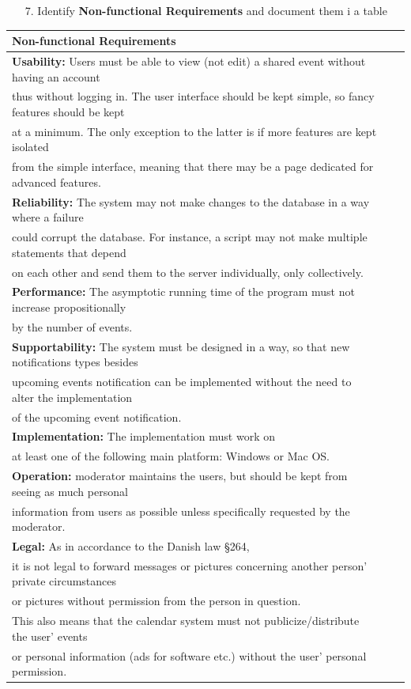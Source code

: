 \documentclass{article}
\begin{document}
\begin{enumerate}
		\item[7.] Identify \textbf{Non-functional Requirements} and document them i a table\\
\end{enumerate}

\begin{tabular}{l r @{} l}
	\textbf{Non-functional Requirements}\\
	\hline
	\textbf{Usability:} Users must be able to view (not edit) a shared event without having an account\\
	 thus without logging in. The user interface should be kept simple, so fancy features should be kept\\
	 at a minimum. The only exception to the latter is if more features are kept isolated\\ 
	 from the simple interface, meaning that there may be a page dedicated for advanced features.\\
	\hline
	\textbf{Reliability:} The system may not make changes to the database in a way where a failure\\
	 could corrupt the database. For instance, a script may not make multiple statements that depend\\
	 on each other and send them to the server individually, only collectively.\\
	\hline
	\textbf{Performance:} The asymptotic running time of the program must not increase propositionally\\
	by the number of events.\\
	\hline
	\textbf{Supportability:} The system must be designed in a way, so that new notifications types besides\\
	upcoming events notification can be implemented without the need to alter the implementation\\
	of the upcoming event notification.\\
	\hline
	\textbf{Implementation:} The implementation must work on\\
	at least one of the following main platform: Windows or Mac OS.\\
	\hline
	\textbf{Operation:} moderator maintains the users, but should be kept from seeing as much personal\\
	 information from users as possible unless specifically requested by the moderator.\\
	\hline
	\textbf{Legal:}  As in accordance to the Danish law \S 264,\\
	 it is not legal to forward messages or pictures concerning another person’ private circumstances\\
	 or pictures without permission from the person in question.\\ 
	This also means that the calendar system must not publicize/distribute the user’ events\\
	 or personal information (ads for software etc.) without the user’ personal permission.\\
	\hline
\end{tabular}
\end{document}
